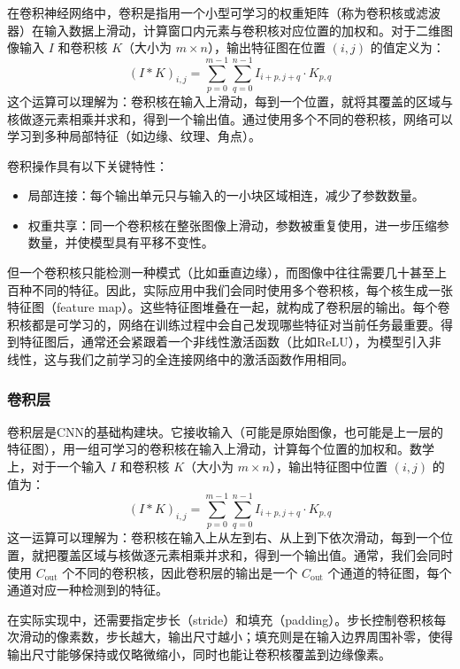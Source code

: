 \documentclass[lang=cn,zihao=-4,a4paper,fontset=windows]{beautybook}
\begin{document}
\begin{definition}[][卷积（Convolution）]
在卷积神经网络中，卷积是指用一个小型可学习的权重矩阵（称为卷积核或滤波器）在输入数据上滑动，计算窗口内元素与卷积核对应位置的加权和。对于二维图像输入 \(I\) 和卷积核 \(K\)（大小为 \(m \times n\)），输出特征图在位置 \((i,j)\) 的值定义为：
\[(I * K)_{i,j} = \sum_{p=0}^{m-1} \sum_{q=0}^{n-1} I_{i+p, j+q} \cdot K_{p,q}\]
这个运算可以理解为：卷积核在输入上滑动，每到一个位置，就将其覆盖的区域与核做逐元素相乘并求和，得到一个输出值。通过使用多个不同的卷积核，网络可以学习到多种局部特征（如边缘、纹理、角点）。
\end{definition}
卷积操作具有以下关键特性：
\begin{itemize}
    \item 局部连接：每个输出单元只与输入的一小块区域相连，减少了参数数量。
    \item 权重共享：同一个卷积核在整张图像上滑动，参数被重复使用，进一步压缩参数量，并使模型具有平移不变性。
\end{itemize}
但一个卷积核只能检测一种模式（比如垂直边缘），而图像中往往需要几十甚至上百种不同的特征。因此，实际应用中我们会同时使用多个卷积核，每个核生成一张特征图（feature map）。这些特征图堆叠在一起，就构成了卷积层的输出。每个卷积核都是可学习的，网络在训练过程中会自己发现哪些特征对当前任务最重要。得到特征图后，通常还会紧跟着一个非线性激活函数（比如ReLU），为模型引入非线性，这与我们之前学习的全连接网络中的激活函数作用相同。

\subsubsection{卷积层}

卷积层是CNN的基础构建块。它接收输入（可能是原始图像，也可能是上一层的特征图），用一组可学习的卷积核在输入上滑动，计算每个位置的加权和。数学上，对于一个输入 \(I\) 和卷积核 \(K\)（大小为 \(m\times n\)），输出特征图中位置 \((i,j)\) 的值为：
\[
(I * K)_{i,j} = \sum_{p=0}^{m-1} \sum_{q=0}^{n-1} I_{i+p, j+q} \cdot K_{p,q}
\]
这一运算可以理解为：卷积核在输入上从左到右、从上到下依次滑动，每到一个位置，就把覆盖区域与核做逐元素相乘并求和，得到一个输出值。通常，我们会同时使用 \(C_{\text{out}}\) 个不同的卷积核，因此卷积层的输出是一个 \(C_{\text{out}}\) 个通道的特征图，每个通道对应一种检测到的特征。

在实际实现中，还需要指定步长（stride）和填充（padding）。步长控制卷积核每次滑动的像素数，步长越大，输出尺寸越小；填充则是在输入边界周围补零，使得输出尺寸能够保持或仅略微缩小，同时也能让卷积核覆盖到边缘像素。
\end{document}
